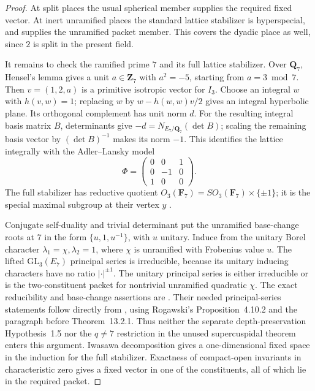 \begin{proof}
At split places the usual spherical member supplies the required
fixed vector. At inert unramified places the standard lattice
stabilizer is hyperspecial, and
\cite[Proposition~1.5.2(5), p.~79]{K17KMSW2014} supplies the
unramified packet member. This covers the dyadic place as well,
since \(2\) is split in the present field.

It remains to check the ramified prime \(7\) and its full lattice
stabilizer. Over \(\mathbf Q_7\), Hensel's lemma gives a unit
\(a\in\mathbf Z_7\) with \(a^2=-5\), starting from \(a=3\bmod7\).
Then \(v=(1,2,a)\) is a primitive isotropic vector for \(I_3\).
Choose an integral \(w\) with \(h(v,w)=1\); replacing \(w\) by
\(w-h(w,w)v/2\) gives an integral hyperbolic plane. Its orthogonal
complement has unit norm \(d\). For the resulting integral basis
matrix \(B\), determinants give
\(-d=N_{E_7/\mathbf Q_7}(\det B)\); scaling the remaining basis
vector by \((\det B)^{-1}\) makes its norm \(-1\). This identifies
the lattice integrally with the Adler--Lansky model
\[
 \Phi=\begin{pmatrix}0&0&1\\0&-1&0\\1&0&0\end{pmatrix}.
\]
The full stabilizer has reductive quotient
\(O_3(\mathbf F_7)=SO_3(\mathbf F_7)\times\{\pm1\}\);
it is the special maximal subgroup at their vertex \(y\)
\cite[\S4.1--4.2.1, pp.~10--12]{K17AdlerLansky2010}.

Conjugate self-duality and trivial determinant put the unramified
base-change roots at \(7\) in the form \(\{u,1,u^{-1}\}\), with \(u\)
unitary. Induce from the unitary Borel character
\(\lambda_1=\chi,\lambda_2=1\), where \(\chi\) is unramified with
Frobenius value \(u\). The lifted \(\mathrm{GL}_3(E_7)\) principal
series is irreducible, because its unitary inducing characters have
no ratio \(|\cdot|^{\pm1}\). The unitary principal series is either
irreducible or is the two-constituent packet for nontrivial
unramified quadratic \(\chi\).
The exact reducibility and base-change assertions are
\cite[\S4.4, pp.~14--15; Proposition~6.1(1),(4), p.~21;
Proposition~7.1(i),(iv), p.~28]{K17AdlerLansky2010}.
Their needed principal-series statements follow directly from
\cite[Proposition~5.1 and its complete proof, pp.~19--20,
published numbering Proposition~4.1]{K17AdlerLanskyUnram},
using Rogawski's Proposition~4.10.2 and the paragraph before
Theorem~13.2.1. Thus neither the separate depth-preservation
Hypothesis~1.5 nor the \(q\ne7\) restriction in the unused
supercuspidal theorem enters this argument.
Iwasawa decomposition gives a one-dimensional fixed space in the
induction for the full stabilizer. Exactness of compact-open
invariants in characteristic zero gives a fixed vector in one of
the constituents, all of which lie in the required packet.


\end{proof}
